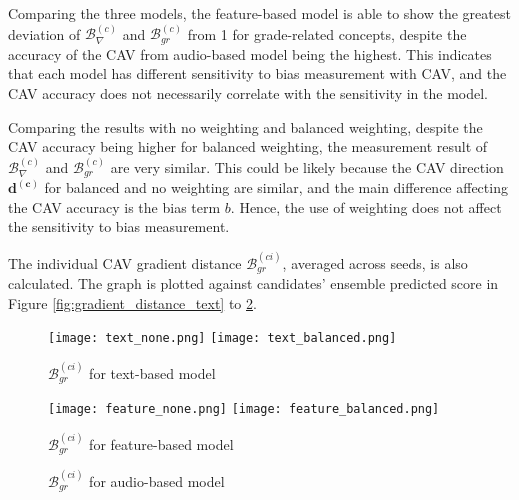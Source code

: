 Comparing the three models, the feature-based model is able to show the greatest deviation of $\mathcal{B}^{(c)}_{\nabla}$ and $\mathcal{B}^{(c)}_{gr}$ from 1 for grade-related concepts, despite the accuracy of the CAV from audio-based model being the highest. This indicates that each model has different sensitivity to bias measurement with CAV, and the CAV accuracy does not necessarily correlate with the sensitivity in the model.

Comparing the results with no weighting and balanced weighting, despite the CAV accuracy being higher for balanced weighting, the measurement result of $\mathcal{B}^{(c)}_{\nabla}$ and $\mathcal{B}^{(c)}_{gr}$ are very similar. This could be likely because the CAV direction $\boldsymbol{d^{(c)}}$ for balanced and no weighting are similar, and the main difference affecting the CAV accuracy is the bias term $b$. Hence, the use of weighting does not affect the sensitivity to bias measurement.

The individual CAV gradient distance $\mathcal{B}^{(ci)}_{gr}$, averaged across seeds, is also calculated. The graph is plotted against candidates’ ensemble predicted score in Figure \ref{fig:gradient_distance_text} to \ref{fig:gradient_distance_audio}.

\begin{figure}[H]
    \centering
    \begin{minipage}[t]{0.48\textwidth}
        \centering
        \texttt{[image: text\_none.png]}
        \hfill
        \texttt{[image: text\_balanced.png]}
        \caption{$\mathcal{B}^{(ci)}_{gr}$ for text-based model}
        \label{fig:gradient_distance_text}
    \end{minipage}
    \hfill
    \begin{minipage}[t]{0.48\textwidth}
        \centering
        \texttt{[image: feature\_none.png]}
        \hfill
        \texttt{[image: feature\_balanced.png]}
        \caption{$\mathcal{B}^{(ci)}_{gr}$ for feature-based model}
        \label{fig:gradient_distance_feature}
    \end{minipage}
\end{figure}

\begin{figure}[H]
    \centering
    \caption{$\mathcal{B}^{(ci)}_{gr}$ for audio-based model}
    \label{fig:gradient_distance_audio}
\end{figure}

